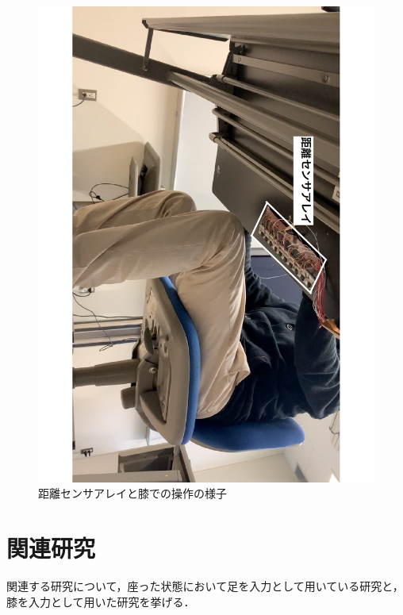 \documentclass[submit, techrep]{ipsj}
\begin{document}
\begin{figure}[h]
	\begin{center}
		\includegraphics[width = 0.7\hsize, angle = 90]{./figures/system_image_2.pdf}
	\end{center}
	\caption{距離センサアレイと膝での操作の様子}
	\label{img:system_image}
\end{figure}


\section{関連研究}
関連する研究について，座った状態において足を入力として用いている研究と，膝を入力として用いた研究を挙げる．

\end{document}
